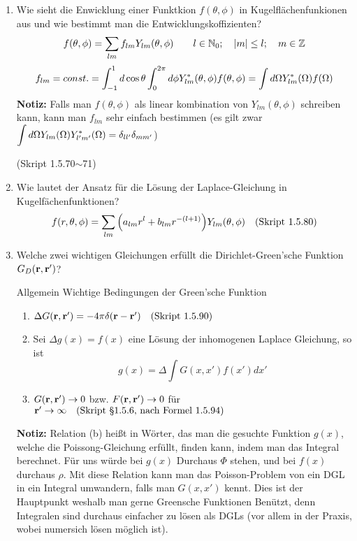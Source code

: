 \begin{enumerate}
  \item Wie sieht die Enwicklung einer Funktkion $f(\theta,\phi)$ in
        Kugelflächenfunkionen aus und wie bestimmt man die 
        Entwicklungskoffizienten?
        $$\displaystyle f(\theta, \phi)=\sum_{lm} f_{lm}Y_{lm}(\theta,\phi)
        \qquad l\in \mathbb{N}_0;\quad \abs{m}\le l; 
        \quad m\in\mathbb{Z}$$
        $$\displaystyle f_{lm}=const.
         =\int_{-1}^{1} d\cos\theta\int_0^{2\pi}d\phi 
         Y^*_{lm}(\theta,\phi)f(\theta,\phi)
         =\int d\Omega Y^*_{lm}(\Omega)f(\Omega)$$
         \textbf{Notiz:} Falls man $f(\theta,\phi)$ als linear kombination
         von $Y_{lm}(\theta,\phi)$ schreiben kann, kann man $f_{lm}$
         sehr einfach bestimmen (es gilt zwar $\displaystyle \int d\Omega 
         Y_{lm}(\Omega)Y_{l'm'}^*(\Omega)=\delta_{ll'}\delta_{mm'}$)
        \begin{center}
          (Skript 1.5.70$\sim$71)
        \end{center}

  \item Wie lautet der Ansatz für die Lösung der Laplace-Gleichung in
        Kugelfächenfunktionen?\\
        $$f(r,\theta,\phi)=
        \sum_{lm}\qty(a_{lm}r^l+b_{lm}r^{-(l+1)})Y_{lm}(\theta,\phi)
        \quad\text{(Skript 1.5.80)}$$
         
  \item Welche zwei wichtigen Gleichungen erfüllt die Dirichlet-Green'sche
        Funktion $G_D(\vb r, \vb r')$?

        Allgemein Wichtige Bedingungen der Green'sche Funktion
        \begin{center}
          \begin{enumerate}
            \item $\Delta G(\vb r, \vb r') = -4\pi\delta(\vb r -\vb r')
              \quad\text{(Skript 1.5.90)}$
            \item Sei $\Delta g(x) = f(x)$ eine Lösung der inhomogenen  
              Laplace Gleichung, so ist 
              $$ g(x)=\Delta\int G(x,x')f(x')dx'$$
            \item $G(\vb r, \vb r') \to 0$ bzw. $F(\vb r, \vb r')\to 0$ 
              für $\vb r'\to\infty
              \quad\text{(Skript §1.5.6, nach Formel 1.5.94)}$
          \end{enumerate}
        \end{center}
        \textbf{Notiz:} Relation (b) heißt in Wörter, das man die gesuchte
        Funktion $g(x)$, welche die Poissong-Gleichung erfüllt, finden
        kann, indem man das Integral berechnet. Für uns würde bei $g(x)$
        Durchaus $\Phi$ stehen, und bei $f(x)$ durchaus $\rho$.
        Mit diese Relation kann man das 
        Poisson-Problem
        von ein DGL in ein Integral umwandern, falls man $G(x,x')$ kennt.
        Dies ist der Hauptpunkt weshalb man gerne Greensche Funktionen
        Benützt, denn Integralen sind durchaus einfacher 
        zu lösen als DGLs (vor allem in der Praxis, wobei numersich
        lösen möglich ist).


\end{enumerate}
